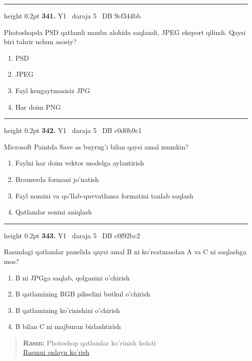 \documentclass[10pt,a4paper,oneside]{article}
\begin{document}
\vspace{2mm}\hrule height 0.2pt \vspace{4mm}
\hypertarget{q341}{\textbf{\color{ink}341.}}  {\color{muted}\scriptsize Y1 \textbullet\ daraja 5 \textbullet\ DB 9cf344bb}
\par
Photoshopda PSD qatlamli manba alohida saqlandi, JPEG eksport qilindi. Qaysi biri tahrir uchun asosiy?
\begin{enumerate}[label=\Alph*),leftmargin=9mm]
\item PSD
\item JPEG
\item Fayl kengaytmasisiz JPG
\item Har doim PNG
\end{enumerate}
\vspace{2mm}\hrule height 0.2pt \vspace{4mm}
\hypertarget{q342}{\textbf{\color{ink}342.}}  {\color{muted}\scriptsize Y1 \textbullet\ daraja 5 \textbullet\ DB c0d0b9c1}
\par
Microsoft Paintda Save as buyrug'i bilan qaysi amal mumkin?
\begin{enumerate}[label=\Alph*),leftmargin=9mm]
\item Faylni har doim vektor modelga aylantirish
\item Brauzerda formani jo'natish
\item Fayl nomini va qo'llab-quvvatlansa formatini tanlab saqlash
\item Qatlamlar sonini aniqlash
\end{enumerate}
\vspace{2mm}\hrule height 0.2pt \vspace{4mm}
\hypertarget{q343}{\textbf{\color{ink}343.}}  {\color{muted}\scriptsize Y1 \textbullet\ daraja 5 \textbullet\ DB c0f92bc2}
\par
Rasmdagi qatlamlar panelida qaysi amal B ni ko'rsatmasdan A va C ni saqlashga mos?
\begin{enumerate}[label=\Alph*),leftmargin=9mm]
\item B ni JPGga saqlab, qolganini o'chirish
\item B qatlamining RGB pikselini butkul o'chirish
\item B qatlamining ko'rinishini o'chirish
\item B bilan C ni majburan birlashtirish
\end{enumerate}
\begin{quote}\footnotesize\color{muted}\textbf{Rasm:} Photoshop qatlamlar ko'rinish holati\\
\href{https://github.com/sarvar9417/attestatsiya/blob/main/public/graphics-web-v2/layer_stack.svg}{Rasmni onlayn ko'rish}
\end{quote}
\end{document}
